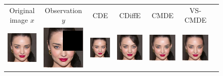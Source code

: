 \begin{figure}
    \begin{center}
    \begingroup
    \setlength{\tabcolsep}{0pt}
 
    \begin{tabular}{ccccccc}
        Original image $x$ & Observation $ y$ & CDE & CDiffE & CMDE & VS-CMDE \\

        \includegraphics[width=.145\textwidth]{Chapter2/samples/extended_results/inpainting/7/x.png} &   
        \includegraphics[width=.145\textwidth]{Chapter2/samples/extended_results/inpainting/7/y.png} &
        \includegraphics[width=.145\textwidth]{Chapter2/samples/extended_results/inpainting/7/CDE.png} & 
        \includegraphics[width=.145\textwidth]{Chapter2/samples/extended_results/inpainting/7/CDiffE.png} &
        \includegraphics[width=.145\textwidth]{Chapter2/samples/extended_results/inpainting/7/cmde.png} &
        \includegraphics[width=.145\textwidth]{Chapter2/samples/extended_results/inpainting/7/VS-CMDE.png}\\
        

\end{tabular}
\end{center}
\end{figure}
